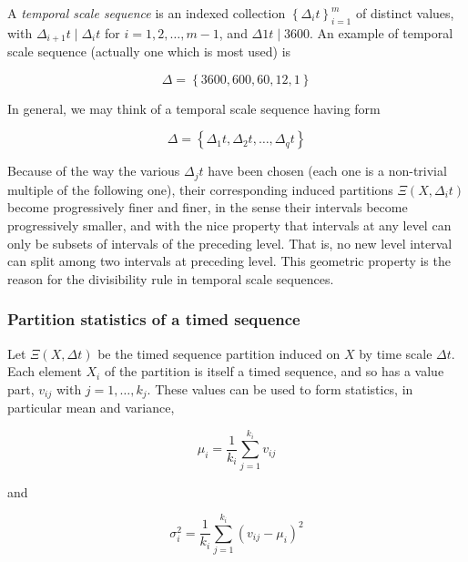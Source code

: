 \documentclass[a4paper,10pt]{book}
\begin{document}
A \emph{temporal scale sequence} is an indexed collection $\left\{\Delta_{i} t\right\}_{i=1}^{m}$ of distinct values, with $\Delta_{i+1} t \mid \Delta_{i} t$ for $i=1, 2, \ldots, m-1$, and $\Delta{1} t \mid 3600$. An example of temporal scale sequence (actually one which is most used) is

\begin{equation}
   \Delta = \left\{3600, 600, 60, 12, 1\right\}
\end{equation}

\noindent In general, we may think of a temporal scale sequence having form

\begin{equation}\label{eq:Temporal scale sequence}
   \Delta = \left\{\Delta_{1} t, \Delta_{2} t, \ldots, \Delta_{q} t\right\}
\end{equation}

Because of the way the various $\Delta_{j} t$ have been chosen (each one is a non-trivial multiple of the following one), their corresponding induced partitions $\Xi(X,\Delta_{i} t)$ become progressively finer and finer, in the sense their intervals become progressively smaller, and with the nice property that intervals at any level can only be subsets of intervals of the preceding level. That is, no new level interval can split among two intervals at preceding level. This geometric property is the reason for the divisibility rule in temporal scale sequences.


\subsubsection{Partition statistics of a timed sequence}

Let $\Xi(X,\Delta t)$ be the timed sequence partition induced on $X$ by time scale $\Delta t$. Each element $X_{i}$ of the partition is itself a timed sequence, and so has a value part, $v_{ij}$ with $j = 1, \ldots, k_{j}$. These values can be used to form statistics, in particular mean and variance,

\begin{equation}\label{eq:Mean}
	\mu_{i} = \frac{1}{k_{i}} \sum_{j=1}^{k_{i}} v_{ij}
\end{equation}

\noindent and

\begin{equation}\label{eq:Variance}
	\sigma_{i}^{2} = \frac{1}{k_{i}} \sum_{j=1}^{k_{i}} \left(v_{ij} - \mu_{i}\right)^{2}
\end{equation}
\end{document}
